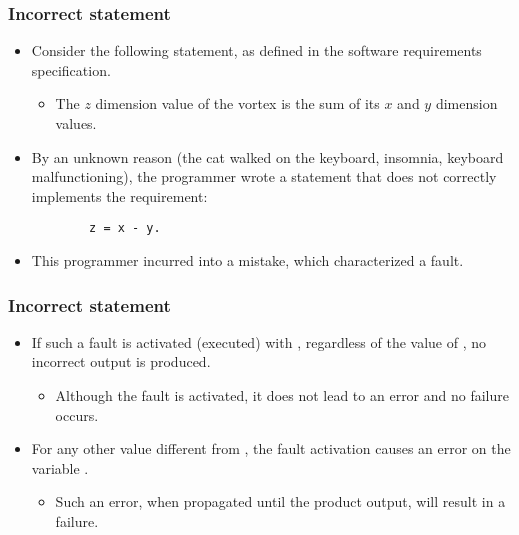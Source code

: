 \begin{frame}[hasprev=false, hasnext=true, fragile]
\label{example:incorrect-statement-3}
\frametitle{Incorrect statement}

\begin{itemize}
	\item Consider the following statement, as defined in the software
	requirements specification.
	\begin{itemize}
		\item The $z$ dimension value of the vortex is the sum of its $x$ and
		$y$ dimension values.
	\end{itemize}

	\item By an unknown reason (the cat walked on the keyboard, insomnia,
	keyboard malfunctioning), the programmer wrote a statement that does
	not correctly implements the requirement:
	\begin{lstlisting}
		z = x - y.
	\end{lstlisting}

	\item This programmer incurred into a mistake, which characterized a fault.
\end{itemize}
\end{frame}


\begin{frame}[hasprev=true, hasnext=false]
\frametitle{Incorrect statement}

\begin{itemize}
	\item If such a fault is activated (executed) with ,
	regardless of the value of , no incorrect output is produced.
	\begin{itemize}
	    \item Although the fault is activated, it does not lead to
	    an error and no failure occurs.
	\end{itemize}

	\item For any other value different from , the fault
	activation causes an error on the variable .
	\begin{itemize}
	    \item Such an error, when propagated until the product output, will
	    result in a failure.
    \end{itemize}
\end{itemize}
\end{frame}
